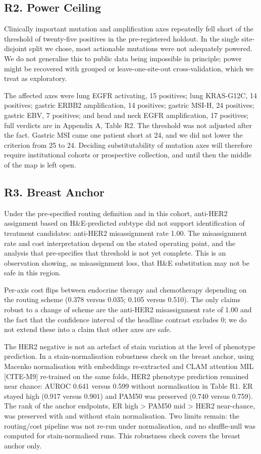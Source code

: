 \subsection*{R2. Power Ceiling}

Clinically important mutation and amplification axes repeatedly fell short of the threshold of twenty-five positives in the pre-registered holdout. In the single site-disjoint split we chose, most actionable mutations were not adequately powered. We do not generalise this to public data being impossible in principle; power might be recovered with grouped or leave-one-site-out cross-validation, which we treat as exploratory.

The affected axes were lung EGFR activating, 15 positives; lung KRAS-G12C, 14 positives; gastric ERBB2 amplification, 14 positives; gastric MSI-H, 24 positives; gastric EBV, 7 positives; and head and neck EGFR amplification, 17 positives; full verdicts are in Appendix A, Table R2. The threshold was not adjusted after the fact. Gastric MSI came one patient short at 24, and we did not lower the criterion from 25 to 24. Deciding substitutability of mutation axes will therefore require institutional cohorts or prospective collection, and until then the middle of the map is left open.

\subsection*{R3. Breast Anchor}

Under the pre-specified routing definition and in this cohort, anti-HER2 assignment based on H\&E-predicted subtype did not support identification of treatment candidates: anti-HER2 misassignment rate 1.00. The misassignment rate and cost interpretation depend on the stated operating point, and the analysis that pre-specifies that threshold is not yet complete. This is an observation showing, as misassignment loss, that H\&E substitution may not be safe in this region.

Per-axis cost flips between endocrine therapy and chemotherapy depending on the routing scheme (0.378 versus 0.035; 0.105 versus 0.510). The only claims robust to a change of scheme are the anti-HER2 misassignment rate of 1.00 and the fact that the confidence interval of the headline contrast excludes 0; we do not extend these into a claim that other axes are safe.

The HER2 negative is not an artefact of stain variation at the level of phenotype prediction. In a stain-normalisation robustness check on the breast anchor, using Macenko normalisation with embeddings re-extracted and CLAM attention MIL [CITE-M9] re-trained on the same folds, HER2 phenotype prediction remained near chance: AUROC 0.641 versus 0.599 without normalisation in Table R1. ER stayed high (0.917 versus 0.901) and PAM50 was preserved (0.740 versus 0.759). The rank of the anchor endpoints, ER high > PAM50 mid > HER2 near-chance, was preserved with and without stain normalisation. Two limits remain: the routing/cost pipeline was not re-run under normalisation, and no shuffle-null was computed for stain-normalised runs. This robustness check covers the breast anchor only.

